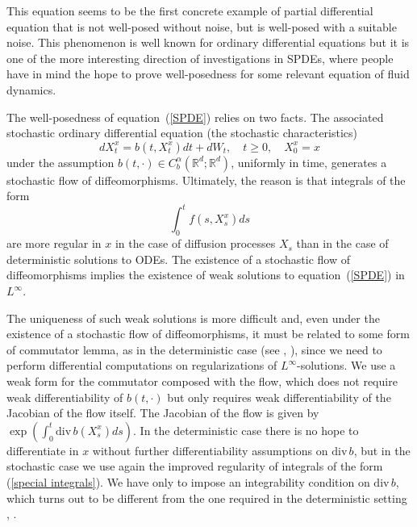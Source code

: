 \documentclass[a4paper,10pt]{article}
\begin{document}
This equation  seems to be the first concrete example  of partial
differential equation that is not well-posed without noise, but is
well-posed with a suitable noise.
This phenomenon is well known for ordinary differential equations
but it is one of the more interesting direction of investigations
in SPDEs, where people have in mind the hope to prove
well-posedness for some relevant equation of fluid dynamics.

The well-posedness of equation~(\ref{SPDE}) relies on two facts.
The associated stochastic ordinary differential equation (the
stochastic characteristics)
\begin{equation}
dX_{t}^{x}=b\left(  t,X_{t}^{x}\right)  dt+dW_{t},\quad t\geq0,\quad X_{0}%
^{x}=x\label{SDE intro}%
\end{equation}
under the assumption $b(t,\cdot)\in C_{b}^{{\alpha}}({\mathbb{R}}%
^{d};{\mathbb{R}}^{d})$, uniformly in time, generates a stochastic flow of
diffeomorphisms. Ultimately, the reason is that integrals of the form
\begin{equation}
\int_{0}^{t}f\left(  s,X_{s}^x\right)  ds\label{special integrals}%
\end{equation}
 are more regular in $x$ in the case of diffusion processes $X_{s}$ than
in the case of deterministic solutions to ODEs. The existence
of a stochastic flow of diffeomorphisms implies the existence of
 weak solutions to equation~(\ref{SPDE}) in $L^{\infty}$.

The uniqueness of such weak solutions is more difficult and, even
under the existence of a stochastic flow of diffeomorphisms, it
must be related to some form of commutator lemma, as in the
deterministic case (see \cite{DiPernaLions}, \cite{Ambrosio}),
since we need to perform differential computations on
regularizations of $L^{\infty}$-solutions. We use a weak form for
the commutator composed with the flow, which does not require weak
differentiability of $b(  t,\cdot)  $ but only requires weak
differentiability of the Jacobian of the flow itself. The Jacobian
of the flow
is given by $\exp(  \int_{0}^{t}{\mathrm{div}\,}b(  X_{s}%
^{x})  ds)  $. In the deterministic case there is no hope to
differentiate in $x$ without further differentiability assumptions
on ${\mathrm{div}\,}b$, but in the stochastic case we use again
the improved regularity of integrals of the form (\ref{special
integrals}). We have only to impose an integrability condition on
${\mathrm{div}\,}b$, which turns out to be different from
 the one required in the deterministic setting \cite{DiPernaLions},
\cite{Ambrosio}.
\end{document}
